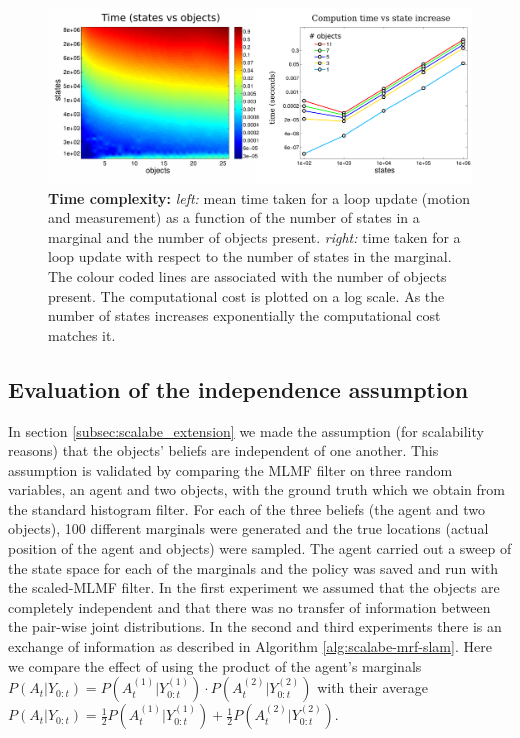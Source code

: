 \begin{figure}
 \includegraphics[width=\textwidth]{./ch5-MLMF/Figures/Figure12_v2.pdf}
 \caption{\textbf{Time complexity:} \textit{left:} mean time taken for a loop update (motion and measurement) as a function of the number of states in a marginal and the 
 number of objects present. \textit{right:} time taken for a loop update with respect to the number of states in the marginal. The colour coded lines are 
 associated with the number of objects present. The computational cost is plotted on a log scale. As the number of states increases exponentially the
 computational cost matches it.}
 \label{fig:time_complexity}
\end{figure}


\subsection{Evaluation of the independence assumption}\label{subsec:eval_indep_assumptiom}

In section \ref{subsec:scalabe_extension} we made the assumption (for scalability reasons) that the objects' beliefs are independent
of one another. This assumption is validated by comparing the MLMF filter on three random variables, an agent and two objects, with the ground truth
which we obtain from the standard histogram filter. For each of the three beliefs (the agent and two objects), 100 different marginals 
were generated and the true locations (actual position of the agent and objects) were sampled. 
The agent carried out  a sweep of the state space for each of the marginals and the policy was saved 
and run with the scaled-MLMF filter. In the first experiment we assumed that the objects are completely independent 
and that there was no transfer of information between the pair-wise joint distributions. In the second and third experiments there 
is an exchange of information as described in Algorithm \ref{alg:scalabe-mrf-slam}. Here we compare the effect of using the product of the agent's marginals $P(A_t|Y_{0:t}) = P(A^{(1)}_t|Y^{(1)}_{0:t}) \cdot P(A^{(2)}_t|Y^{(2)}_{0:t})$ 
with their average $P(A_t|Y_{0:t}) = \frac{1}{2}P(A^{(1)}_t|Y^{(1)}_{0:t}) + \frac{1}{2}P(A^{(2)}_t|Y^{(2)}_{0:t})$. 

